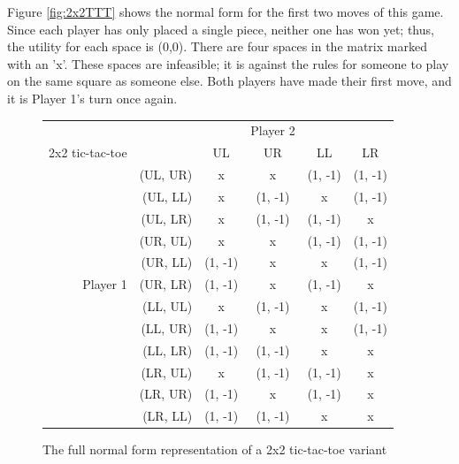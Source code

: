 Figure \ref{fig:2x2TTT} shows the normal form for the first two moves of this game. Since each player has only placed a single piece, neither one has won yet; thus, the utility for each space is (0,0). There are four spaces in the matrix marked with an 'x'. These spaces are infeasible; it is against the rules for someone to play on the same square as someone else. Both players have made their first move, and it is Player 1's turn once again.\\
\begin{figure}[H]
  \centering
  \begin{tabular}{r r | c | c | c | c |}
    &\multicolumn{1}{c}{}&\multicolumn{1}{c}{}&\multicolumn{1}{c}{Player 2}&\multicolumn{1}{c}{}\\
    \multicolumn{1}{c}{2x2 tic-tac-toe}&\multicolumn{1}{c}{}&\multicolumn{1}{c}{UL}&
    \multicolumn{1}{c}{UR}&\multicolumn{1}{c}{LL}&\multicolumn{1}{c}{LR}\\ \cline{3-6}
    & (UL, UR) & x & x & (1, -1) & (1, -1) \\ \cline{3-6}
    & (UL, LL) & x & (1, -1) & x & (1, -1) \\ \cline{3-6}
    & (UL, LR) & x & (1, -1) & (1, -1) & x \\ \cline{3-6}
    & (UR, UL) & x & x & (1, -1) & (1, -1) \\ \cline{3-6}
    & (UR, LL) & (1, -1) & x & x & (1, -1) \\ \cline{3-6}
    Player 1 & (UR, LR) & (1, -1) & x & (1, -1) & x \\ \cline{3-6}
    & (LL, UL) & x & (1, -1) & x & (1, -1) \\ \cline{3-6}
    & (LL, UR) & (1, -1) & x & x & (1, -1) \\ \cline{3-6}
    & (LL, LR) & (1, -1) & (1, -1) & x & x \\ \cline{3-6}
    & (LR, UL) & x & (1, -1) & (1, -1) & x \\ \cline{3-6}
    & (LR, UR) & (1, -1) & x & (1, -1) & x \\ \cline{3-6}
    & (LR, LL) & (1, -1) & (1, -1) & x & x \\ \cline{3-6}
  \end{tabular}
  \caption{The full normal form representation of a 2x2 tic-tac-toe variant}
  \label{fig:full2x2TTT}
\end{figure}

